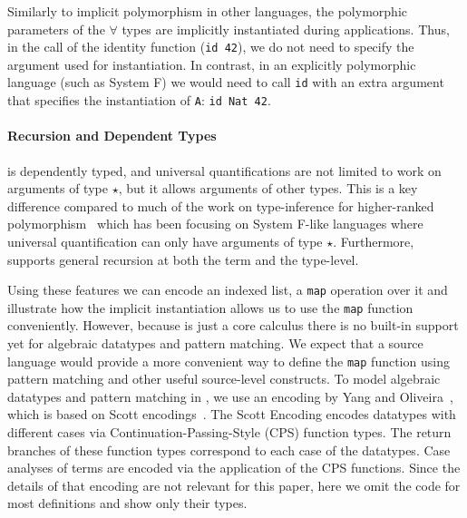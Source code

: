 Similarly to implicit polymorphism in other languages,
the polymorphic parameters of the $\forall$ types are implicitly instantiated
during applications. Thus, in the call of the identity function (\lstinline{id 42}), we
do not need to specify the argument used for instantiation. In contrast,
in an explicitly polymorphic language (such as System F) we would need
to call \lstinline{id} with an extra argument that specifies the instantiation of \lstinline{A}:
\lstinline{id Nat 42}.

\paragraph{Recursion and Dependent Types}

\name is dependently typed, and universal quantifications are not limited to work
on arguments of type $\star$, but it allows arguments of other types. This is
a key difference compared to much of the work on type-inference for higher-ranked
polymorphism~\citep{dunfield2013complete,le2003ml,leijen2008hmf,vytiniotis2008fph,jones2007practical}
which has been focusing on System F-like
languages where universal quantification can only have arguments of type $\star$.
Furthermore, \name supports general recursion at both the term and the type-level.

Using these features we can encode an indexed list, a \lstinline{map} operation over it
and illustrate how the implicit instantiation allows us to use the \lstinline{map}
function conveniently.
However, because \name is just a core calculus there is no built-in support
yet for algebraic datatypes and pattern matching.
We expect that a source language would provide a more convenient
way to define the \lstinline{map} function using pattern matching and other useful source-level
constructs. To model algebraic datatypes and pattern matching in \name, we
use an encoding by Yang and Oliveira~\citep{yang2019pure},
which is based on Scott encodings~\citep{mogensen1992efficient}.
The Scott Encoding encodes datatypes with different cases via
Continuation-Passing-Style (CPS) function types. The return branches of these
function types correspond to each case of the datatypes.
Case analyses of terms are encoded via the application of the CPS functions.
Since the details of that encoding are not relevant for this paper,
here we omit the code for most definitions and show only their types.

